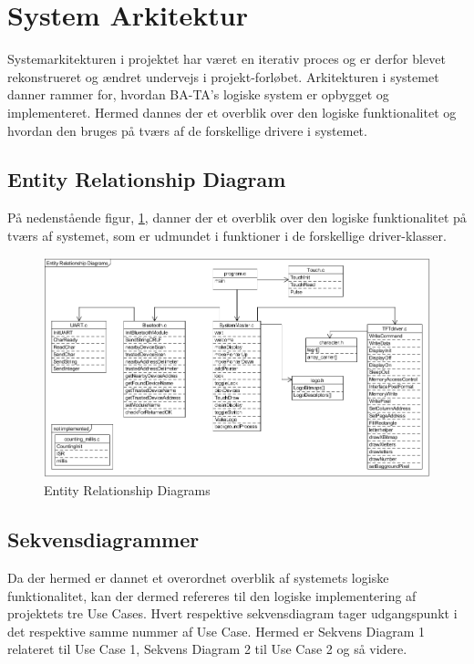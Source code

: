 \graphicspath{{Chapters/SystemArkitektur/}}

\section{System Arkitektur}

Systemarkitekturen i projektet har været en iterativ proces og er derfor blevet rekonstrueret og ændret undervejs i projekt-forløbet.
Arkitekturen i systemet danner rammer for, hvordan BA-TA's logiske system er opbygget og implementeret. Hermed dannes der et overblik over den logiske funktionalitet og hvordan den bruges på tværs af de forskellige drivere i systemet.

\subsection{Entity Relationship Diagram}
På nedenstående figur, \ref{fig:Entity}, danner der et overblik over den logiske funktionalitet på tværs af systemet, som er udmundet i funktioner i de forskellige driver-klasser.

\begin{figure}[H]
	\centering
	\includegraphics[width = 500 pt]{Img/Entity.png}
	\caption{Entity Relationship Diagrams}
	\label{fig:Entity}
\end{figure}

\newpage

\subsection{Sekvensdiagrammer}
Da der hermed er dannet et overordnet overblik af systemets logiske funktionalitet, kan der dermed refereres til den logiske implementering af projektets tre Use Cases. Hvert respektive sekvensdiagram tager udgangspunkt i det respektive samme nummer af Use Case. Hermed er Sekvens Diagram 1 relateret til Use Case 1, Sekvens Diagram 2 til Use Case 2 og så videre.

